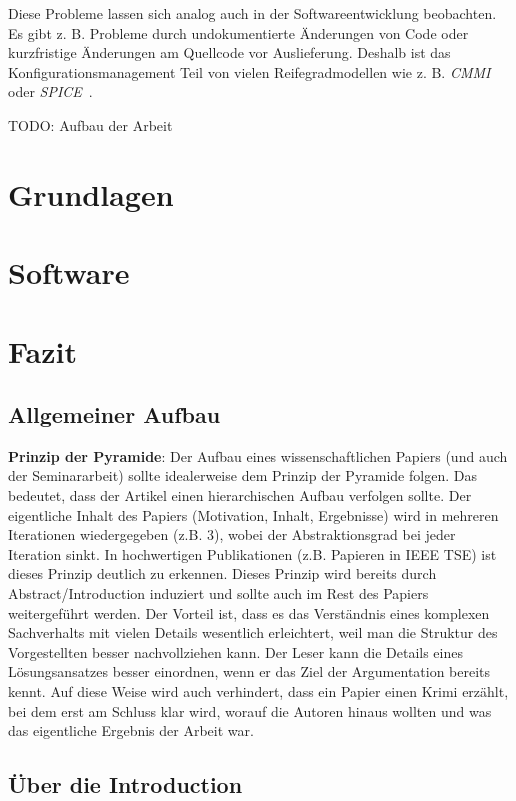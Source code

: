 \documentclass[runningheads,a4paper]{uwsese}
\begin{document}
Diese Probleme lassen sich analog auch in der Softwareentwicklung beobachten.
Es gibt z. B. Probleme durch undokumentierte Änderungen von Code oder
kurzfristige Änderungen am Quellcode vor
Auslieferung. Deshalb ist das Konfigurationsmanagement Teil von vielen
Reifegradmodellen wie z. B. {\em CMMI} oder
{\em SPICE}~\cite{weischedel2002}.

TODO: Aufbau der Arbeit

\section{Grundlagen}

\section{Software}

\section{Fazit}

\subsection{Allgemeiner Aufbau}

\textbf{Prinzip der Pyramide}: Der Aufbau eines wissenschaftlichen Papiers (und auch der Seminararbeit) sollte idealerweise dem Prinzip der Pyramide folgen. Das bedeutet, dass der Artikel einen hierarchischen Aufbau verfolgen sollte. Der eigentliche Inhalt des Papiers (Motivation, Inhalt, Ergebnisse) wird in mehreren Iterationen wiedergegeben (z.B. 3), wobei der Abstraktionsgrad bei jeder Iteration sinkt. In hochwertigen Publikationen (z.B. Papieren in IEEE TSE) ist dieses Prinzip deutlich zu erkennen. Dieses Prinzip wird bereits durch Abstract/Introduction induziert und sollte auch im Rest des Papiers weitergeführt werden. Der Vorteil ist, dass es das Verständnis eines komplexen Sachverhalts mit vielen Details wesentlich erleichtert, weil man die Struktur des Vorgestellten besser nachvollziehen kann. Der Leser kann die Details eines Lösungsansatzes besser einordnen, wenn er das Ziel der Argumentation bereits kennt. Auf diese Weise wird auch verhindert, dass ein Papier einen Krimi erzählt, bei dem erst am Schluss klar wird, worauf die Autoren hinaus wollten und was das eigentliche Ergebnis der Arbeit war.

\subsection{Über die Introduction}
\label{sub:intro}
\end{document}
